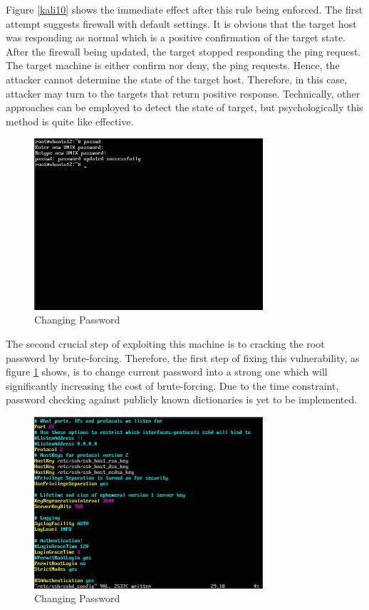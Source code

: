 \documentclass{article}
\begin{document}
Figure \ref{kali10} shows the immediate effect after this rule being enforced. The first attempt suggests firewall 
with default settings. It is obvious that the target host was responding as normal which is a positive 
confirmation of the target state. After the firewall being updated, the target stopped responding the ping request. 
The target machine is either confirm nor deny, the ping requests. Hence, the attacker cannot determine the state of 
the target host. Therefore, in this case, attacker may turn to the targets that return positive response. 
Technically, other approaches can be employed to detect the state of target, but psychologically this method is 
quite like effective.

\begin{figure}[H]
  \includegraphics[width=8.5cm]{ubuntu8}
  \caption{Changing Password}
  \label{ubuntu8}
\end{figure}

The second crucial step of exploiting this machine is to cracking the root password by brute-forcing. 
Therefore, the first step of fixing this vulnerability, as figure \ref{ubuntu8} shows, is to change current password into a strong one which 
will significantly increasing the cost of brute-forcing. Due to the time constraint, password checking against 
publicly known dictionaries is yet to be implemented.

\begin{figure}[H]
  \includegraphics[width=8.5cm]{ubuntu6}
  \caption{Changing Password}
  \label{ubuntu6}
\end{figure}
\end{document}
